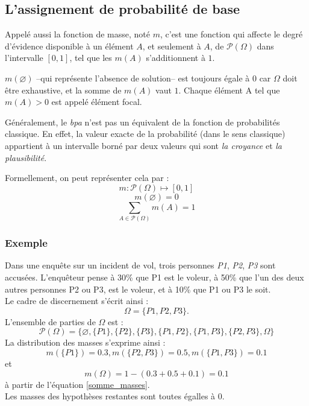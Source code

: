 \subsection{L’assignement de probabilité de base}

Appelé aussi la fonction de masse, noté $m$, c'est une fonction qui affecte le degré d’évidence
disponible à un élément $A$, et seulement à $A$, de $\mathcal{P}(\Omega)$ dans l’intervalle
$[0,1]$, tel que les $m(A)$ s’additionnent à $1$.

$m(\varnothing)$ --qui représente l’absence
de solution-- est toujours égale à $0$ car $\Omega$ doit être exhaustive, et la somme de $m(A)$
vaut $1$. Chaque élément A tel que $m(A) > 0$ est appelé élément focal.\cite{dubois1988theorie115}

Généralement, le \emph{bpa} n’est pas un équivalent de la fonction de probabilités classique. En effet,
la valeur exacte de la probabilité (dans le sens classique) appartient à un intervalle borné par
deux valeurs qui sont \emph{la croyance} et \emph{la plausibilité}.\cite{sentz2002combination14}

Formellement, on peut représenter cela par :
\begin{equation}
m : \mathcal{P}(\Omega) \mapsto [0,1]
\end{equation}
\begin{equation}
m(\varnothing) = 0
\end{equation}
\begin{equation} \label{somme_masses}
\sum_{A \in \mathcal{P}(\Omega)} m(A) = 1
\end{equation}

\subsubsection{Exemple}
Dans une enquête sur un incident de vol, trois personnes \textit{P1}, \textit{P2}, \textit{P3}
sont accusées. L’enquêteur pense à 30\% que P1 est le voleur, à 50\% que l’un des deux autres
personnes P2 ou P3, est le voleur, et à 10\% que P1 ou P3 le soit.\\
Le cadre de discernement s'écrit ainsi : $$\Omega = \{P1, P2, P3\}.$$
L'ensemble de parties de $\Omega$ est : $$\mathcal{P}(\Omega) = \{\varnothing, \{P1\}, \{P2\},
\{P3\}, \{P1, P2\}, \{P1, P3\}, \{P2, P3\}, \Omega\}$$
La distribution des masses s'exprime ainsi : $$m(\{P1\}) = 0.3, m(\{P2, P3\})  = 0.5,
m(\{P1, P3\}) = 0.1$$ et $$m(\Omega) = 1 - (0.3+0.5+0.1) = 0.1$$ à partir de l’équation \ref{somme_masses}.\\
Les masses des hypothèses restantes sont toutes égalles à $0$.

